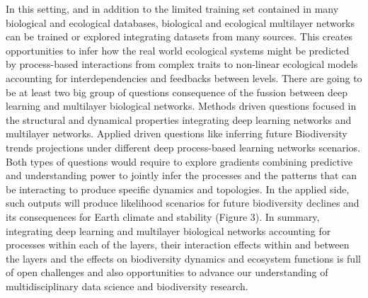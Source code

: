 \documentclass[authoryear,1p,12pt]{elsarticle}
\begin{document}
In this setting, and in addition to the limited training set contained
in many biological and ecological databases, biological and ecological
multilayer networks can be trained or explored integrating datasets
from many sources. This creates opportunities to infer how the real
world ecological systems might be predicted by process-based
interactions from complex traits to non-linear ecological models
accounting for interdependencies and feedbacks between levels. There
are going to be at least two big group of questions consequence of the
fussion between deep learning and multilayer biological
networks. Methods driven questions focused in the structural and
dynamical properties integrating deep learning networks and multilayer
networks. Applied driven questions like inferring future Biodiversity
trends projections under different deep process-based learning
networks scenarios. Both types of questions would require to explore
gradients combining predictive and understanding power to jointly
infer the processes and the patterns that can be interacting to
produce specific dynamics and topologies. In the applied side, such
outputs will produce likelihood scenarios for future biodiversity
declines and its consequences for Earth climate and stability (Figure
3). In summary, integrating deep learning and multilayer biological
networks accounting for processes within each of the layers, their
interaction effects within and between the layers and the effects on
biodiversity dynamics and ecosystem functions is full of open
challenges and also opportunities to advance our understanding of
multidisciplinary data science and biodiversity research.
\end{document}
